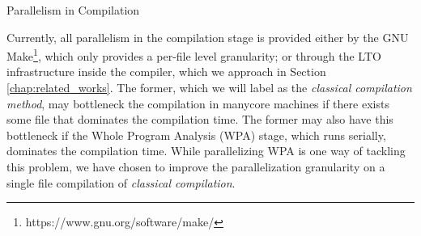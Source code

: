 \begin{section}{Parallelism in Compilation}



Currently, all parallelism in the compilation stage is provided either by the
GNU Make\footnote{https://www.gnu.org/software/make/}, which only provides a
per-file level granularity; or through the LTO infrastructure inside the compiler, which we
approach in Section \ref{chap:related_works}. The former, which we will label as
the \textit{classical compilation method}, may bottleneck the compilation in
manycore machines if there exists some file that dominates the compilation time.
The former may also have this bottleneck if the Whole Program Analysis (WPA) stage,
which runs serially, dominates the compilation time. While parallelizing
WPA is one way of tackling this problem, we have chosen to improve the parallelization
granularity on a single file compilation of \textit{classical compilation}.




\end{section}
